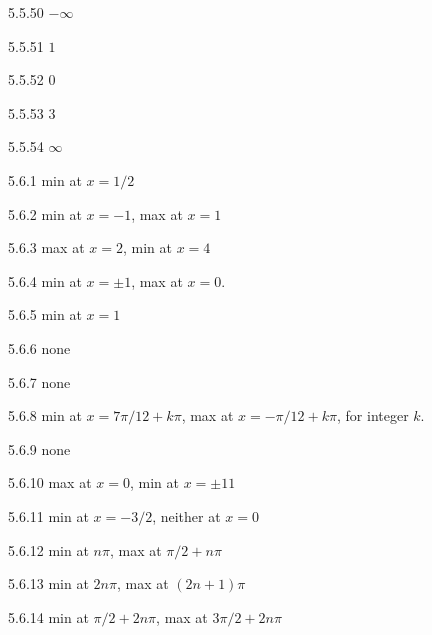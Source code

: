 \begin{Answer}{5.5.50}
{$-\infty$}
\end{Answer}
\begin{Answer}{5.5.51}
{$1$}
\end{Answer}
\begin{Answer}{5.5.52}
{$0$}
\end{Answer}
\begin{Answer}{5.5.53}
  {$3$}
\end{Answer}
\begin{Answer}{5.5.54}
 {$\infty$}
\end{Answer}
\begin{Answer}{5.6.1}
 min at $x=1/2$
\end{Answer}
\begin{Answer}{5.6.2}
 min at $x=-1$, max at $x=1$
\end{Answer}
\begin{Answer}{5.6.3}
 max at $x=2$, min at $x=4$
\end{Answer}
\begin{Answer}{5.6.4}
 min at $x=\pm 1$, max at $x=0$.
\end{Answer}
\begin{Answer}{5.6.5}
 min at $x=1$
\end{Answer}
\begin{Answer}{5.6.6}
 none
\end{Answer}
\begin{Answer}{5.6.7}
 none
\end{Answer}
\begin{Answer}{5.6.8}
 min at $x=7\pi/12+k\pi$, max at $x=-\pi/12+k\pi$, for integer $k$.
\end{Answer}
\begin{Answer}{5.6.9}
 none
\end{Answer}
\begin{Answer}{5.6.10}
 max at $x=0$, min at $x=\pm 11$
\end{Answer}
\begin{Answer}{5.6.11}
 min at $x=-3/2$, neither at $x=0$
\end{Answer}
\begin{Answer}{5.6.12}
 min at $n\pi$, max at $\pi/2+n\pi$
\end{Answer}
\begin{Answer}{5.6.13}
 min at $2n\pi$, max at $(2n+1)\pi$
\end{Answer}
\begin{Answer}{5.6.14}
 min at $\pi/2+2n\pi$, max at $3\pi/2+2n\pi$
\end{Answer}

